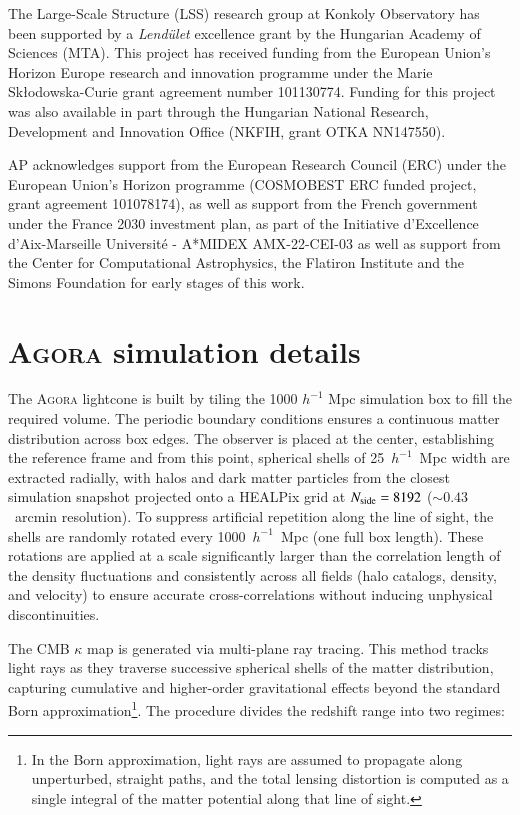 \documentclass[]{aa} %
\begin{document}
The Large-Scale Structure (LSS) research group at Konkoly Observatory has been supported by a \emph{Lend\"ulet} excellence grant by the Hungarian Academy of Sciences (MTA). This project has received funding from the European Union’s Horizon Europe research and innovation programme under the Marie Skłodowska-Curie grant agreement number 101130774. Funding for this project was also available in part through the Hungarian National Research, Development and Innovation Office (NKFIH, grant OTKA NN147550). 

AP acknowledges support from the European Research Council (ERC) under the European Union’s Horizon programme (COSMOBEST ERC funded project, grant agreement 101078174), as well as support from the French government under the France 2030 investment plan, as part of the Initiative d’Excellence d’Aix-Marseille Université - A*MIDEX AMX-22-CEI-03 as well as support from the Center for Computational Astrophysics, the Flatiron Institute and the Simons Foundation for early stages of this work.






\appendix

\section{\textsc{Agora} simulation details}
\label{appendix:agora_details}

The \textsc{Agora} lightcone is built by tiling the 1000 $h^{-1}$ Mpc simulation box to fill the required volume. The periodic boundary conditions ensures a continuous matter distribution across box edges. The observer is placed at the center, establishing the reference frame and from this point, spherical shells of 25~$h^{-1}$~Mpc width are extracted radially, with halos and dark matter particles from the closest simulation snapshot projected onto a HEALPix grid at $N_{\rm side} = 8192$ ($\sim 0.43$~arcmin resolution). To suppress artificial repetition along the line of sight, the shells are randomly rotated every 1000~$h^{-1}$~Mpc (one full box length). These rotations are applied at a scale significantly larger than the correlation length of the density fluctuations and consistently across all fields (halo catalogs, density, and velocity) to ensure accurate cross-correlations without inducing unphysical discontinuities.

The CMB $\kappa$ map is generated via multi-plane ray tracing. This method tracks light rays as they traverse successive spherical shells of the matter distribution, capturing cumulative and higher-order gravitational effects beyond the standard Born approximation\footnote{In the Born approximation, light rays are assumed to propagate along unperturbed, straight paths, and the total lensing distortion is computed as a single integral of the matter potential along that line of sight.}.
The procedure divides the redshift range into two regimes:
\end{document}
